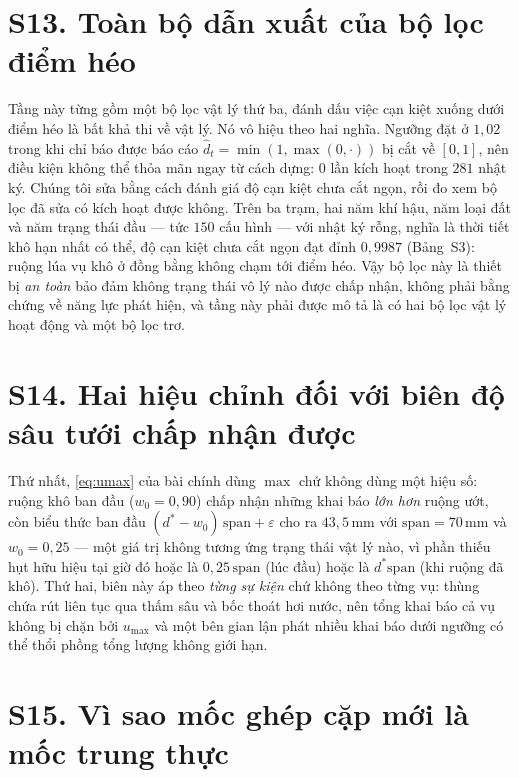 \section*{S13. Toàn bộ dẫn xuất của bộ lọc điểm héo}

Tầng này từng gồm một bộ lọc vật lý thứ ba, đánh dấu việc cạn kiệt xuống dưới điểm héo là
bất khả thi về vật lý. Nó vô hiệu theo hai nghĩa. Ngưỡng đặt ở $1{,}02$ trong khi chỉ báo
được báo cáo $\hat d_t=\min(1,\max(0,\cdot))$ bị cắt về $[0,1]$, nên điều kiện không thể
thỏa mãn ngay từ cách dựng: $0$ lần kích hoạt trong $281$ nhật ký. Chúng tôi sửa bằng cách
đánh giá độ cạn kiệt chưa cắt ngọn, rồi đo xem bộ lọc đã sửa có kích hoạt được không. Trên
ba trạm, hai năm khí hậu, năm loại đất và năm trạng thái đầu --- tức $150$ cấu hình --- với
nhật ký rỗng, nghĩa là thời tiết khô hạn nhất có thể, độ cạn kiệt chưa cắt ngọn đạt đỉnh
$0{,}9987$ (Bảng~S3): ruộng lúa vụ khô ở đồng bằng không chạm tới điểm héo. Vậy bộ lọc này
là thiết bị \emph{an toàn} bảo đảm không trạng thái vô lý nào được chấp nhận, không phải
bằng chứng về năng lực phát hiện, và tầng này phải được mô tả là có hai bộ lọc vật lý hoạt
động và một bộ lọc trơ.

\section*{S14. Hai hiệu chỉnh đối với biên độ sâu tưới chấp nhận được}

Thứ nhất, \eqref{eq:umax} của bài chính dùng $\max$ chứ không dùng một hiệu số: ruộng khô ban
đầu ($w_0=0{,}90$) chấp nhận những khai báo \emph{lớn hơn} ruộng ướt, còn biểu thức ban đầu
$(d^{*}-w_0)\,\mathrm{span}+\varepsilon$ cho ra $43{,}5$\,mm với $\mathrm{span}=70$\,mm và
$w_0=0{,}25$ --- một giá trị không tương ứng trạng thái vật lý nào, vì phần thiếu hụt hữu hiệu
tại giờ đó hoặc là $0{,}25\,\mathrm{span}$ (lúc đầu) hoặc là $d^{*}\mathrm{span}$ (khi ruộng đã
khô). Thứ hai, biên này áp theo \emph{từng sự kiện} chứ không theo từng vụ: thùng chứa rút
liên tục qua thấm sâu và bốc thoát hơi nước, nên tổng khai báo cả vụ không bị chặn bởi
$u_{\max}$ và một bên gian lận phát nhiều khai báo dưới ngưỡng có thể thổi phồng tổng lượng không
giới hạn.

\section*{S15. Vì sao mốc ghép cặp mới là mốc trung thực}

